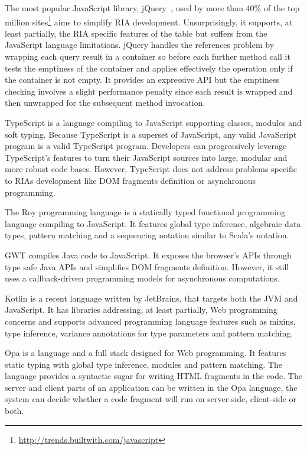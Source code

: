 \documentclass[american,english,runningheads]{llncs}
\begin{document}
The most popular JavaScript library, jQuery~\cite{Bibeault08_jQuery}, used by more than 40\% of the top million
sites\footnote{\href{http://trends.builtwith.com/javascript}{http://trends.builtwith.com/javascript}} aims to
simplify RIA development. Unsurprisingly, it supports, at least partially, the RIA specific features of the table but
suffers from the JavaScript language limitations. jQuery handles the  references problem by wrapping each
query result in a container so before each further method call it tests the emptiness of the container and applies
effectively the operation only if the container is not empty. It provides an expressive API but the emptiness
checking involves a slight performance penalty since each result is wrapped and then unwrapped for the subsequent
method invocation.

TypeScript is a language compiling to JavaScript supporting classes, modules and soft typing. Because TypeScript is
a superset of JavaScript, any valid JavaScript program is a valid TypeScript program. Developers can progressively
leverage TypeScript’s features to turn their JavaScript sources into large, modular and more robust code bases.
However, TypeScript does not address problems specific to RIAs development like DOM fragments definition or
asynchronous programming.

The Roy programming language is a statically typed functional programming language compiling to JavaScript. It
features global type inference, algebraic data types, pattern matching and a sequencing notation similar to Scala’s
 notation.

GWT compiles Java code to JavaScript. It exposes the browser’s APIs through type safe Java APIs and simplifies DOM
fragments definition. However, it still uses a callback-driven programming models for asynchronous computations.

Kotlin is a recent language written by JetBrains, that targets both the JVM and JavaScript. It has libraries
addressing, at least partially, Web programming concerns and supports advanced programming language features such as
mixins, type inference, variance annotations for type parameters and pattern matching.

Opa is a language and a full stack designed for Web programming. It features static typing with global
type inference, modules and pattern matching. The language provides a syntactic sugar for writing HTML fragments in
the code. The server and client parts of an application can be written in the Opa language, the system can decide
whether a code fragment will run on server-side, client-side or both.
\end{document}
